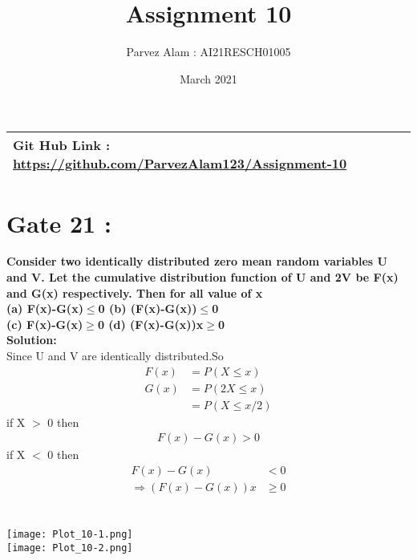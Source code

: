 \documentclass{article}
\title{Assignment 10}
\author{Parvez Alam : AI21RESCH01005 }
\date{March 2021}
\begin{document}
\maketitle
\begin{multicols}{2}
\begin{center}
    \begin{tabular}{|p{5cm}|}
    \hline
         Git Hub Link : \url{https://github.com/ParvezAlam123/Assignment-10} \\
    \hline
    \end{tabular}
\end{center}


\section{Gate 21 :}
\textbf{Consider two identically distributed zero mean random variables U and V. Let the cumulative distribution function of U and 2V be F(x) and G(x) respectively. Then for all value of x  \\
(a) F(x)-G(x)\(\leq\)0  (b) (F(x)-G(x))\(\leq\)0 \\
(c) F(x)-G(x)\(\geq\)0  (d) (F(x)-G(x))x\(\geq\)0} \\
\textbf{Solution: } \\
Since U and V are identically distributed.So
\begin{align}
    F(x) &= P(X\leq x) \nonumber \\
    G(x) &= P(2X\leq x) \nonumber \\
         &= P(X \leq x/2) \nonumber
\end{align}
if X \(>\) 0 then 
\begin{align}
    F(x)-G(x)>0 \nonumber
\end{align}
if X \(<\) 0 then
\begin{align}
    F(x)-G(x)&<0 \nonumber \\
    \Rightarrow (F(x)-G(x))x& \geq 0 \nonumber 
\end{align}
\\ \\
\texttt{[image: Plot\_10-1.png]} \\
\texttt{[image: Plot\_10-2.png]}



\end{multicols}
\end{document}
